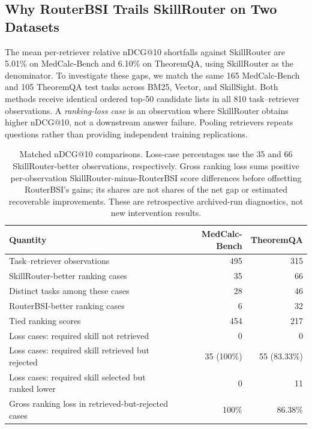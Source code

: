 \subsection{Why RouterBSI Trails SkillRouter on Two Datasets}
\label{app:routing-gap}
The mean per-retriever relative nDCG@10 shortfalls against SkillRouter are 5.01\% on MedCalc-Bench and 6.10\% on TheoremQA, using SkillRouter as the denominator. To investigate these gaps, we match the same 165 MedCalc-Bench and 105 TheoremQA test tasks across BM25, Vector, and SkillSight. Both methods receive identical ordered top-50 candidate lists in all 810 task--retriever observations. A \emph{ranking-loss case} is an observation where SkillRouter obtains higher nDCG@10, not a downstream answer failure. Pooling retrievers repeats questions rather than providing independent training replications.

\begin{table}[t]
\centering
\small
\begin{tabular}{lrr}
\toprule
Quantity & MedCalc-Bench & TheoremQA \\
\midrule
Task--retriever observations & 495 & 315 \\
SkillRouter-better ranking cases & 35 & 66 \\
Distinct tasks among these cases & 28 & 46 \\
RouterBSI-better ranking cases & 6 & 32 \\
Tied ranking scores & 454 & 217 \\
Loss cases: required skill not retrieved & 0 & 0 \\
Loss cases: required skill retrieved but rejected & 35 (100\%) & 55 (83.33\%) \\
Loss cases: required skill selected but ranked lower & 0 & 11 \\
Gross ranking loss in retrieved-but-rejected cases & 100\% & 86.38\% \\
\bottomrule
\end{tabular}
\caption{Matched nDCG@10 comparisons. Loss-case percentages use the 35 and 66 SkillRouter-better observations, respectively. Gross ranking loss sums positive per-observation SkillRouter-minus-RouterBSI score differences before offsetting RouterBSI's gains; its shares are not shares of the net gap or estimated recoverable improvements. These are retrospective archived-run diagnostics, not new intervention results.}
\label{tab:app-routing-gap}
\end{table}


